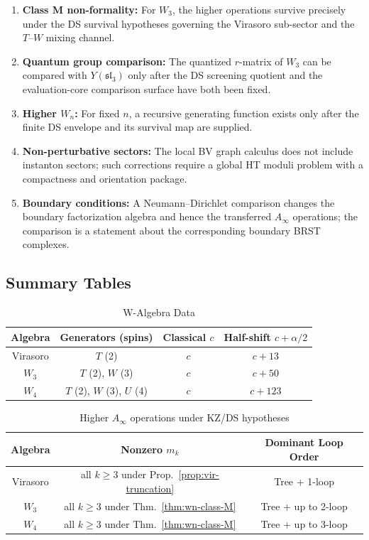 \begin{enumerate}
\item \textbf{Class M non-formality:} For $W_3$, the higher operations
survive precisely under the DS survival hypotheses governing the
Virasoro sub-sector and the $T$--$W$ mixing channel.

\item \textbf{Quantum group comparison:} The quantized $r$-matrix of
$W_3$ can be compared with $Y(\mathfrak{sl}_3)$ only after the DS
screening quotient and the evaluation-core comparison surface have
both been fixed.

\item \textbf{Higher $W_n$:} For fixed $n$, a recursive generating
function exists only after the finite DS envelope and its survival
map are supplied.

\item \textbf{Non-perturbative sectors:} The local BV graph calculus
does not include instanton sectors; such corrections require a global
HT moduli problem with a compactness and orientation package.

\item \textbf{Boundary conditions:} A Neumann--Dirichlet comparison
changes the boundary factorization algebra and hence the transferred
$A_\infty$ operations; the comparison is a statement about the
corresponding boundary BRST complexes.
\end{enumerate}

\subsection{Summary Tables}

\begin{table}[h]
\centering
\caption{W-Algebra Data}
\begin{tabular}{|c|c|c|c|}
\hline
Algebra & Generators (spins) & Classical $c$ & Half-shift $c+\alpha/2$ \\
\hline
Virasoro & $T$ (2) & $c$ & $c + 13$ \\
$W_3$ & $T$ (2), $W$ (3) & $c$ & $c + 50$ \\
$W_4$ & $T$ (2), $W$ (3), $U$ (4) & $c$ & $c + 123$ \\
\hline
\end{tabular}
\end{table}

\begin{table}[h]
\centering
\caption{Higher $A_\infty$ operations under KZ/DS hypotheses}
\begin{tabular}{|c|c|c|}
\hline
Algebra & Nonzero $m_k$ & Dominant Loop Order \\
\hline
Virasoro & all $k \geq 3$ under Prop.~\ref{prop:vir-truncation} & Tree + 1-loop \\
$W_3$ & all $k \geq 3$ under Thm.~\ref{thm:wn-class-M} & Tree + up to 2-loop \\
$W_4$ & all $k \geq 3$ under Thm.~\ref{thm:wn-class-M} & Tree + up to 3-loop \\
\hline
\end{tabular}
\end{table}

